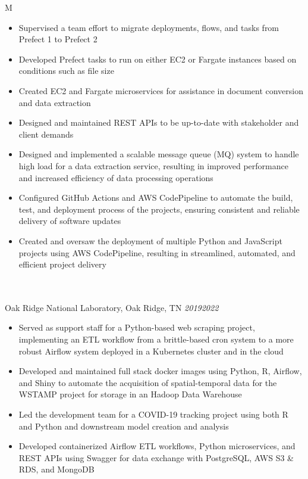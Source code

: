 \documentclass[10pt]{article}%
\begin{document}
\begin{tabularx}{\linewidth}{M}
\begin{itemize}[topsep=-12pt,parsep=0em]
         \item Supervised a team effort to migrate deployments, flows, and tasks from Prefect 1 to Prefect 2 %
         \item Developed Prefect tasks to run on either EC2 or Fargate instances based on conditions such as file size %
         \item Created EC2 and Fargate microservices for assistance in document conversion and data extraction %
         \item Designed and maintained REST APIs to be up-to-date with stakeholder and client demands %
         \item Designed and implemented a scalable message queue (MQ) system to handle high load for a data extraction service, resulting in improved performance and increased efficiency of data processing operations %
         \item Configured GitHub Actions and AWS CodePipeline to automate the build, test, and deployment process of the projects, ensuring consistent and reliable delivery of software updates %
         \item Created and oversaw the deployment of multiple Python and JavaScript projects using AWS CodePipeline, resulting in streamlined, automated, and efficient project delivery %
     \end{itemize} \\
       \\
      Oak Ridge National Laboratory, Oak Ridge, TN \textit{2019\textemdash{}2022} \\
      \begin{itemize}[topsep=-12pt,parsep=0em]
          \setlength\itemsep{0em}
          \item Served as support staff for a Python-based web scraping project, implementing an ETL workflow from a brittle-based cron system to a more robust Airflow system deployed in a Kubernetes cluster and in the cloud %
          \item Developed and maintained full stack docker images using Python, R, Airflow, and Shiny to automate the acquisition of spatial-temporal data for the WSTAMP project for storage in an Hadoop Data Warehouse %
          \item Led the development team for a COVID-19 tracking project using both R and Python and downstream model creation and analysis %
          \item Developed containerized Airflow ETL workflows, Python microservices, and REST APIs using Swagger for data exchange with PostgreSQL, AWS S3 \& RDS, and MongoDB %

\end{itemize}
\end{tabularx}
\end{document}
